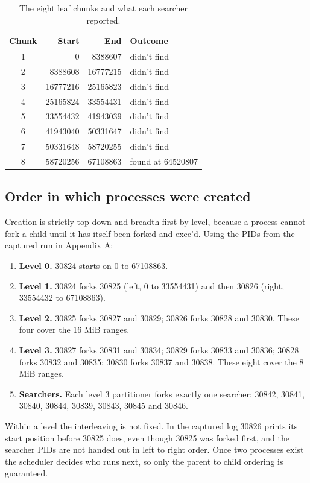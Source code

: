 \documentclass[11pt]{article}
\begin{document}
\begin{table}[h]
	\centering
	\begin{tabular}{crrl}
		\toprule
		Chunk & Start & End & Outcome \\
		\midrule
		1 & 0 & 8388607 & didn't find \\
		2 & 8388608 & 16777215 & didn't find \\
		3 & 16777216 & 25165823 & didn't find \\
		4 & 25165824 & 33554431 & didn't find \\
		5 & 33554432 & 41943039 & didn't find \\
		6 & 41943040 & 50331647 & didn't find \\
		7 & 50331648 & 58720255 & didn't find \\
		8 & 58720256 & 67108863 & found at 64520807 \\
		\bottomrule
	\end{tabular}
	\caption{The eight leaf chunks and what each searcher reported.}
	\label{tab:chunks}
\end{table}

\subsection*{Order in which processes were created}
Creation is strictly top down and breadth first by level, because a process cannot
fork a child until it has itself been forked and exec'd. Using the PIDs from the
captured run in Appendix A:

\begin{enumerate}
	\item \textbf{Level 0.} 30824 starts on 0 to 67108863.
	\item \textbf{Level 1.} 30824 forks 30825 (left, 0 to 33554431) and then 30826
	(right, 33554432 to 67108863).
	\item \textbf{Level 2.} 30825 forks 30827 and 30829; 30826 forks 30828 and
	30830. These four cover the 16 MiB ranges.
	\item \textbf{Level 3.} 30827 forks 30831 and 30834; 30829 forks 30833 and
	30836; 30828 forks 30832 and 30835; 30830 forks 30837 and 30838. These eight
	cover the 8 MiB ranges.
	\item \textbf{Searchers.} Each level 3 partitioner forks exactly one searcher:
	30842, 30841, 30840, 30844, 30839, 30843, 30845 and 30846.
\end{enumerate}

Within a level the interleaving is not fixed. In the captured log 30826 prints its
start position before 30825 does, even though 30825 was forked first, and the
searcher PIDs are not handed out in left to right order. Once two processes exist
the scheduler decides who runs next, so only the parent to child ordering is
guaranteed.
\end{document}

